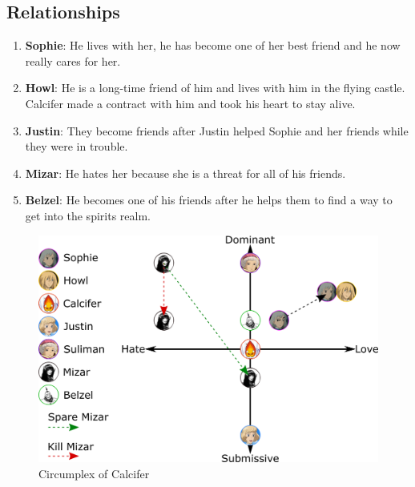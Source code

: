 \subsection{Relationships}
\begin{enumerate}
\item \textbf{Sophie}: He lives with her, he has become one of her best friend and he now really cares for her.
\item \textbf{Howl}: He is a long-time friend of him and lives with him in the flying castle. Calcifer made a contract with him and took his heart to stay alive.
\item \textbf{Justin}: They become friends after Justin helped Sophie and her friends while they were in trouble.
\item \textbf{Mizar}: He hates her because she is a threat for all of his friends.
\item \textbf{Belzel}: He becomes one of his friends after he helps them to find a way to get into the spirits realm.
\end{enumerate}

\begin{figure}[H]
  \centering
  \includegraphics[width=14cm]{Images/Diagrams/Circumplexes/calciferCircumplex}
  \caption{Circumplex of Calcifer}
\end{figure}

